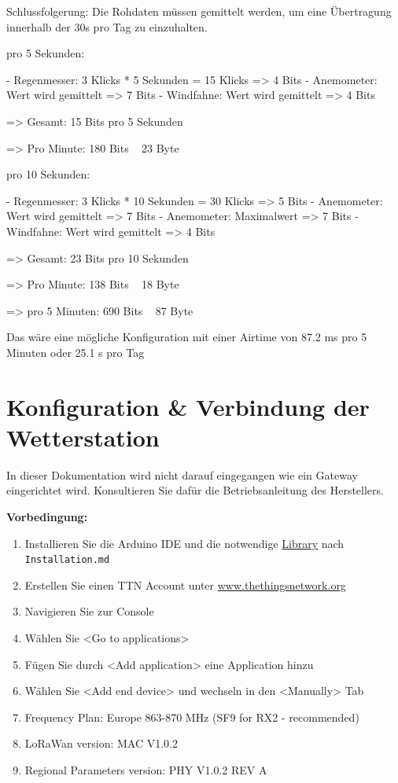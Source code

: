 \documentclass[12pt]{article}
\begin{document}
      Schlussfolgerung: Die Rohdaten müssen gemittelt werden, um eine Übertragung innerhalb der 30s pro Tag zu einzuhalten.

      
      pro 5 Sekunden:

      - Regenmesser: 3 Klicks * 5 Sekunden = 15 Klicks => 4 Bits
      - Anemometer: Wert wird gemittelt => 7 Bits
      - Windfahne: Wert wird gemittelt => 4 Bits

      => Gesamt: 15 Bits pro 5 Sekunden

      => Pro Minute: 180 Bits ~ 23 Byte


      pro 10 Sekunden:

      - Regenmesser: 3 Klicks * 10 Sekunden = 30 Klicks => 5 Bits
      - Anemometer: Wert wird gemittelt => 7 Bits
      - Anemometer: Maximalwert => 7 Bits
      - Windfahne: Wert wird gemittelt => 4 Bits

      => Gesamt: 23 Bits pro 10 Sekunden

      => Pro Minute: 138 Bits ~ 18 Byte

      => pro 5 Minuten: 690 Bits ~ 87 Byte

      Das wäre eine mögliche Konfiguration mit einer Airtime von 87.2 ms pro 5 Minuten oder 25.1 s pro Tag
  
      

  \section{Konfiguration \& Verbindung der Wetterstation}
    In dieser Dokumentation wird nicht darauf eingegangen wie ein Gateway eingerichtet wird.
    Konsultieren Sie dafür die Betriebsanleitung des Herstellers.

    \textbf{Vorbedingung:}
    \begin{enumerate}
      \item Installieren Sie die Arduino IDE und die notwendige \href{https://github.com/dragino/arduino-lmic}{Library} nach \texttt{Installation.md}
      \item Erstellen Sie einen TTN Account unter \href{www.thethingsnetwork.org}{www.thethingsnetwork.org}
      \item Navigieren Sie zur Console
      \item Wählen Sie \textless Go to applications\textgreater{}
      \item Fügen Sie durch \textless Add application\textgreater{} eine Application hinzu
      \item Wählen Sie \textless Add end device\textgreater{} und wechseln in den \textless Manually\textgreater{} Tab
      \item Frequency Plan: Europe 863-870 MHz (SF9 for RX2 - recommended)
      \item LoRaWan version: MAC V1.0.2
      \item Regional Parameters version: PHY V1.0.2 REV A
    \end{enumerate}
    
\end{document}
